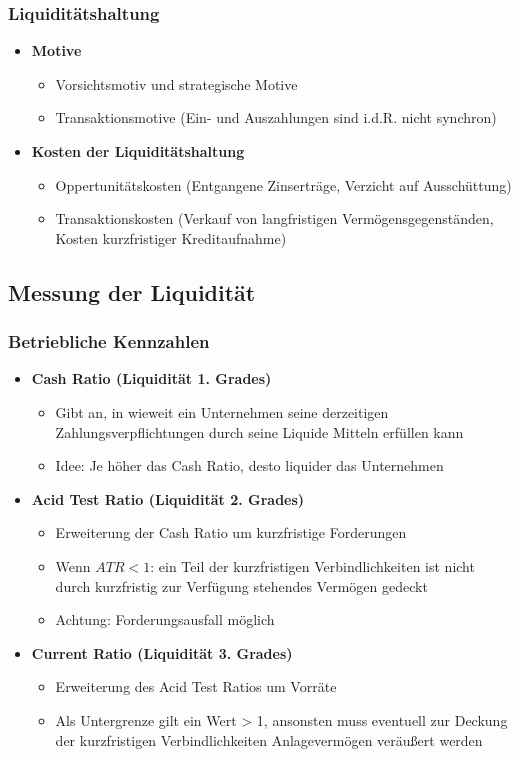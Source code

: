 \subsubsection{Liquiditätshaltung}
\begin{itemize}
	\item \textbf{Motive}
	\begin{itemize}
		\item Vorsichtsmotiv und strategische Motive
		\item Transaktionsmotive (Ein- und Auszahlungen sind i.d.R. nicht synchron)
	\end{itemize}
	\item \textbf{Kosten der Liquiditätshaltung}
	\begin{itemize}
		\item Oppertunitätskosten (Entgangene Zinserträge, Verzicht auf Ausschüttung)
		\item Transaktionskosten (Verkauf von langfristigen Vermögensgegenständen, Kosten kurzfristiger Kreditaufnahme)
	\end{itemize}
\end{itemize}


\subsection{Messung der Liquidität}

\subsubsection{Betriebliche Kennzahlen}
\begin{itemize}
	\item \textbf{Cash Ratio (Liquidität 1. Grades)}
	\begin{itemize}
		\item Gibt an, in wieweit ein Unternehmen seine derzeitigen Zahlungsverpflichtungen durch seine Liquide Mitteln erfüllen kann
		\item Idee: Je höher das Cash Ratio, desto liquider das Unternehmen
	\end{itemize}
	\item \textbf{Acid Test Ratio (Liquidität 2. Grades)}
	\begin{itemize}
		\item Erweiterung der Cash Ratio um kurzfristige Forderungen
		\item Wenn \(ATR < 1\): ein Teil der kurzfristigen Verbindlichkeiten ist nicht durch kurzfristig zur Verfügung stehendes Vermögen gedeckt
		\item Achtung: Forderungsausfall möglich
	\end{itemize}
	\item \textbf{Current Ratio (Liquidität 3. Grades)}
	\begin{itemize}
		\item Erweiterung des Acid Test Ratios um Vorräte
		\item Als Untergrenze gilt ein Wert > 1, ansonsten muss eventuell zur Deckung der kurzfristigen Verbindlichkeiten Anlagevermögen veräußert werden
	\end{itemize}
\end{itemize}


